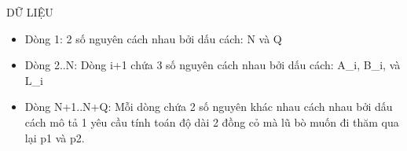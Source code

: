DỮ LIỆU
\begin{itemize}
	\item     Dòng 1: 2 số nguyên cách nhau bởi dấu cách: N và Q   
	\item     Dòng 2..N: Dòng i+1 chứa 3 số nguyên cách nhau bởi dấu cách: A\_i,         B\_i, và L\_i   
	\item     Dòng N+1..N+Q: Mỗi dòng chứa 2 số nguyên khác nhau cách nhau bởi dấu cách         mô tả 1 yêu cầu tính toán độ dài 2 đồng cỏ mà lũ bò muốn đi thăm qua lại p1 và p2.   
\end{itemize}